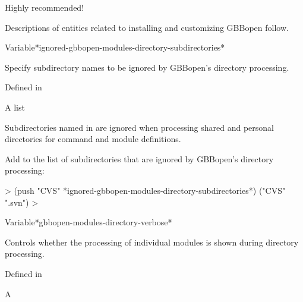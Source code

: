 \documentclass[10pt,twoside,english,pdftex]{article}
\begin{document}
Highly recommended!

\W\entities
\T{}
\T Descriptions of entities related to installing and customizing GBBopen follow.
\T\clearpage
\T\renewcommand{\headrulewidth}{0.01pt}


\begin{functiondoc}%
  {Variable}{*ignored-gbbopen-modules-directory-subdirectories*}{}%

\fnsyntax

\fnpurpose Specify subdirectory names to be ignored by GBBopen's
 directory processing.

\fnpackage {}

\fnmodule Defined in 

\fnvaluetype A list

\fninitialvalue {}

\fndescription Subdirectories named in 
 are
ignored when processing shared and personal  directories
for command and module definitions.

\fnexample
Add  to the list of subdirectories that are ignored by GBBopen's
 directory processing:
%
\W\supp
\begin{example}
  > (push "CVS" *ignored-gbbopen-modules-directory-subdirectories*)
  ("CVS" ".svn")
  >
\end{example}

\end{functiondoc}


\begin{functiondoc}%
  {Variable}{*gbbopen-modules-directory-verbose*}{}%

\fnsyntax

\fnpurpose Controls whether the processing of individual modules is shown
during  directory processing.

\fnpackage {}

\fnmodule Defined in 

\fnvaluetype A 

\fninitialvalue {}

\end{functiondoc}
\end{document}
